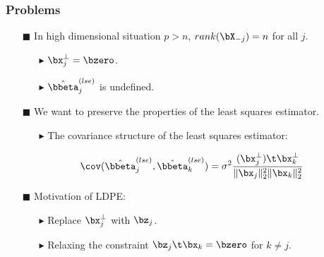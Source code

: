 \begin{frame}
\frametitle{Problems}
\begin{itemize}

\item[$\blacksquare$] In high dimensional situation $p>n$, $rank(\bX_{-j})=n$ for all $j$. %
\begin{itemize}
\item[$\blacktriangleright$] $\bx^{\bot}_{j}=\bzero$.
\item[$\blacktriangleright$] $\hat{\bbeta}^{(lse)}_{j}$ is undefined.
\end{itemize}
\item[$\blacksquare$] We want to preserve the properties of the least squares estimator.
\begin{itemize}
\item[$\blacktriangleright$] The covariance structure of the least squares estimator:
\end{itemize}
\begin{equation}
\cov(\hat{\bbeta}^{(lse)}_{j},\hat{\bbeta}^{(lse)}_{k})=\sigma^{2} \frac{(\bx^{\bot}_{j})\t \bx^{\bot}_{k}}{\|\bx_{j}\|^{2}_{2}\|\bx_{k}\|^{2}_{2}}
\end{equation}
\item[$\blacksquare$] Motivation of LDPE:
\begin{itemize}
      \item[$\blacktriangleright$] Replace $\bx^{\bot}_{j}$ with $\bz_{j}$.
      \medskip
      \item[$\blacktriangleright$] Relaxing the constraint $\bz_{j}\t \bx_{k}=\bzero$ for $k\neq j$.
\vspace{3mm}

\end{itemize}

\end{itemize}


\end{frame}

